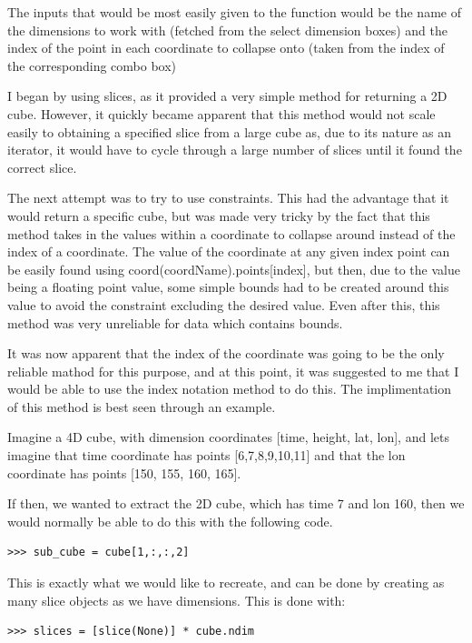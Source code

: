 \documentclass[whitecover]{MO_report}
\begin{document}
The inputs that would be most easily given to the function would be the name
of the dimensions to work with (fetched from the select dimension boxes) and
the index of the point in each coordinate to collapse onto (taken from the
index of the corresponding combo box)

I began by using slices, as it provided a very simple method for returning a
2D cube. However, it quickly became apparent that this method would not scale
easily to obtaining a specified slice from a large cube as, due to its nature as
an iterator, it would have to cycle through a large number of slices until it
found the correct slice.

The next attempt was to try to use constraints. This had the advantage that it
would return a specific cube, but was made very tricky by the fact that this
method takes in the values within a coordinate to collapse around instead of
the index of a coordinate. The value of the coordinate at any given index point
can be easily found using coord(coordName).points[index], but then, due to
the value being a floating point value, some simple bounds had to be created
around this value to avoid the constraint excluding the desired value. Even
after this, this method was very unreliable for data which contains bounds.

It was now apparent that the index of the coordinate was going to be the only
reliable mathod for this purpose, and at this point, it was suggested to me
that I would be able to use the index notation method to do this. The
implimentation of this method is best seen through an example.

Imagine a 4D cube, with dimension coordinates [time, height, lat, lon], and
lets imagine that time coordinate has points [6,7,8,9,10,11] and that the
lon coordinate has points [150, 155, 160, 165].

If then, we wanted to extract the 2D cube, which has time 7 and lon 160, then
we would normally be able to do this with the following code.

\begin{verbatim}
>>> sub_cube = cube[1,:,:,2]
\end{verbatim}

This is exactly what we would like to recreate, and can be done by creating as
many slice objects as we have dimensions. This is done with:

\begin{verbatim}
>>> slices = [slice(None)] * cube.ndim
\end{verbatim}
\end{document}
